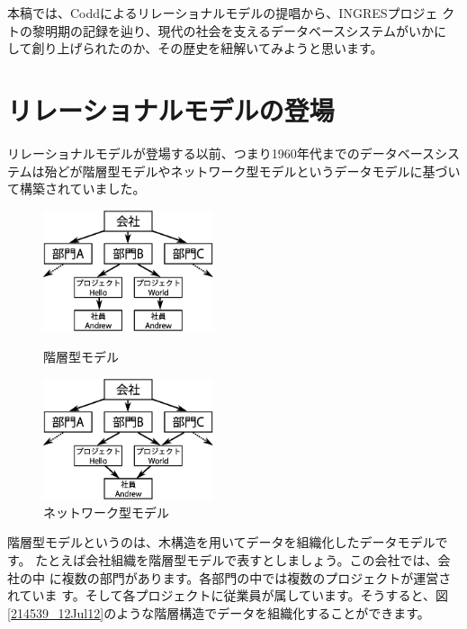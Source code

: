 本稿では、Coddによるリレーショナルモデルの提唱から、INGRESプロジェ
クトの黎明期の記録を辿り、現代の社会を支えるデータベースシステムがいかに
して創り上げられたのか、その歴史を紐解いてみようと思います。


\section{リレーショナルモデルの登場}


リレーショナルモデルが登場する以前、つまり1960年代までのデータベースシス
テムは殆どが階層型モデルやネットワーク型モデルというデータモデルに基づい
て構築されていました。


\begin{figure}[tb]
 \begin{minipage}{0.48\textwidth}
  \begin{center}
   \includegraphics[width=5cm]{hayamiz/images/hierarchical-data-model.eps}
   \caption{階層型モデル}
   \label{214539_12Jul12}
  \end{center}
 \end{minipage}
 \begin{minipage}{0.48\textwidth}
  \begin{center}
   \includegraphics[width=5cm]{hayamiz/images/network-data-model.eps}
   \caption{ネットワーク型モデル}
   \label{214707_12Jul12}
  \end{center}
 \end{minipage}
 \vspace*{-0.1\Cvs}
\end{figure}


階層型モデルというのは、木構造を用いてデータを組織化したデータモデルです。
たとえば会社組織を階層型モデルで表すとしましょう。この会社では、会社の中
に複数の部門があります。各部門の中では複数のプロジェクトが運営されていま
す。そして各プロジェクトに従業員が属しています。そうすると、図
\ref{214539_12Jul12}のような階層構造でデータを組織化することができます。


